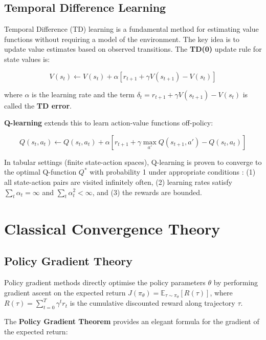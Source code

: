 \documentclass[12pt,a4paper]{report}
\begin{document}
\subsection{Temporal Difference Learning}

Temporal Difference (TD) learning is a fundamental method for estimating value functions without requiring a model of the environment. The key idea is to update value estimates based on observed transitions. The \textbf{TD(0)} update rule for state values is:

\begin{equation}
V(s_t) \leftarrow V(s_t) + \alpha \left[ r_{t+1} + \gamma V(s_{t+1}) - V(s_t) \right]
\end{equation}

where $\alpha$ is the learning rate and the term $\delta_t = r_{t+1} + \gamma V(s_{t+1}) - V(s_t)$ is called the \textbf{TD error}.

\textbf{Q-learning} \cite{regehr2021elementary} extends this to learn action-value functions off-policy:

\begin{equation}
Q(s_t, a_t) \leftarrow Q(s_t, a_t) + \alpha \left[ r_{t+1} + \gamma \max_{a'} Q(s_{t+1}, a') - Q(s_t, a_t) \right]
\end{equation}

In tabular settings (finite state-action spaces), Q-learning is proven to converge to the optimal Q-function $Q^*$ with probability 1 under appropriate conditions \cite{regehr2021elementary}: (1) all state-action pairs are visited infinitely often, (2) learning rates satisfy $\sum_t \alpha_t = \infty$ and $\sum_t \alpha_t^2 < \infty$, and (3) the rewards are bounded.

\section{Classical Convergence Theory}

\subsection{Policy Gradient Theory}

Policy gradient methods directly optimise the policy parameters $\theta$ by performing gradient ascent on the expected return $J(\pi_\theta) = \mathbb{E}_{\tau \sim \pi_\theta}[R(\tau)]$, where $R(\tau) = \sum_{t=0}^T \gamma^t r_t$ is the cumulative discounted reward along trajectory $\tau$.

The \textbf{Policy Gradient Theorem} \cite{sutton1999policy} provides an elegant formula for the gradient of the expected return:
\end{document}
